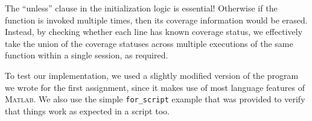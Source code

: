 \documentclass[letterpaper,11pt]{article}
\newcommand{\matlab}{\textsc{Matlab}}
\begin{document}
The ``unless'' clause in the initialization logic is essential! Otherwise if
the function is invoked multiple times, then its coverage information would be
erased. Instead, by checking whether each line has known coverage status, we
effectively take the union of the coverage statuses across multiple executions
of the same function within a single session, as required.

To test our implementation, we used a slightly modified version of the program
we wrote for the first assignment, since it makes use of most language features
of \matlab{}. We also use the simple \texttt{for_script} example that was
provided to verify that things work as expected in a script too.
\end{document}

